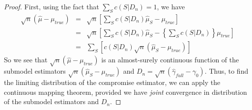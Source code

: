 \documentclass[12pt]{article}
\theoremstyle{definition}
\begin{document}
\begin{proof}
First, using the fact that $\sum_S c(S|D_n) = 1$, we have
	\begin{eqnarray*}
		\sqrt{n}\left( \hat{\mu} -\mu_{true} \right) &=& \sqrt{n}\left[\sum_{S} c(S|D_n)\hat{\mu}_S - \mu_{true} \right]\\
			&=& \sqrt{n}\left[\sum_{S} c(S|D_n)\hat{\mu}_S - \left\{\sum_{S} c(S|D_n)\right\}\mu_{true} \right]\\
			&=&\sum_S \left[ c(S|D_n) \sqrt{n}\left( \hat{\mu}_S -\mu_{true} \right)  \right]
\end{eqnarray*}
So we see that $\sqrt{n}\left( \hat{\mu} -\mu_{true} \right)$ is an almost-surely continuous function of the submodel estimators $\sqrt{n}\left( \hat{\mu}_S -\mu_{true} \right)$ and $D_n = \sqrt{n}\left( \hat{\gamma}_{full} - \gamma_0 \right)$. Thus, to find the limiting distribution of the compromise estimator, we can apply the continuous mapping theorem, provided we have \emph{joint} convergence in distribution of the submodel estimators and $D_n$.


\end{proof}
\end{document}
